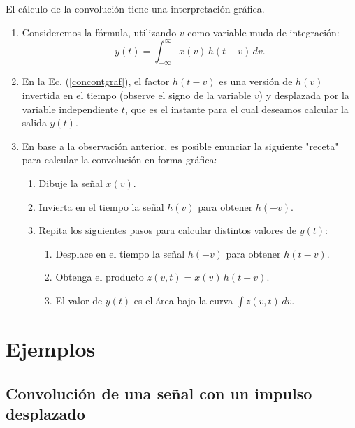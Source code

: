 El cálculo de la convolución tiene una interpretación gráfica.
\begin{enumerate}
	\item Consideremos la fórmula, utilizando $v$ como variable muda de integración:
	\begin{equation}
		y(t) = \int_{-\infty}^{\infty} x(v) \, h(t - v) \, dv. \label{concontgraf}
	\end{equation}
	
	\item En la Ec. (\ref{concontgraf}), el factor $h(t - v)$ es una versión de $h(v)$ invertida en el tiempo (observe el signo de la variable $v$) y desplazada por la variable independiente $t$, que es el instante para el cual deseamos calcular la salida $y(t)$.
	
	\item En base a la observación anterior, es posible enunciar la siguiente "receta" para calcular la convolución en forma gráfica:
	\begin{enumerate}
		\item Dibuje la señal $x(v)$.
		\item Invierta en el tiempo la señal $h(v)$ para obtener $h(-v)$.
		\item Repita los siguientes pasos para calcular distintos valores de $y(t)$:
		\begin{enumerate}
			\item Desplace en el tiempo la señal $h(-v)$ para obtener $h(t-v)$.
			\item Obtenga el producto $z(v,t) = x(v) \, h(t - v)$.
			\item El valor de $y(t)$ es el área bajo la curva $\int z(v,t) \, dv$.
		\end{enumerate}
	\end{enumerate}
\end{enumerate}

\section{Ejemplos}

\subsection{Convolución de una señal con un impulso desplazado}

